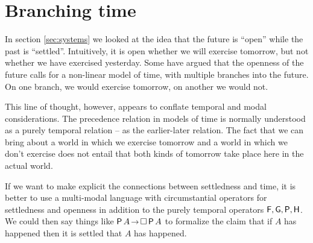 


\section{Branching time}\label{sec:branching}

In section \ref{sec:systems} we looked at the idea that the future is ``open''
while the past is ``settled''. Intuitively, it is open whether we will exercise
tomorrow, but not whether we have exercised yesterday. Some have argued that the
openness of the future calls for a non-linear model of time, with multiple
branches into the future. On one branch, we would exercise tomorrow, on another
we would not.

This line of thought, however, appears to conflate temporal and modal considerations.
The precedence relation in models of time is normally understood as a purely
temporal relation -- as the earlier-later relation. The fact that we can bring
about a world in which we exercise tomorrow and a world in which we don't
exercise does not entail that both kinds of tomorrow take place here in the
actual world.

If we want to make explicit the connections between settledness and time, it is
better to use a multi-modal language with circumstantial operators for
settledness and openness in addition to the purely temporal operators
$\operatorname{\mathsf{F}}, \operatorname{\mathsf{G}}, \operatorname{\mathsf{P}}, \operatorname{\mathsf{H}}$. We could then say things like $\tP A \to \Box \tP A$ to
formalize the claim that if $A$ has happened then it is settled that $A$ has
happened.


